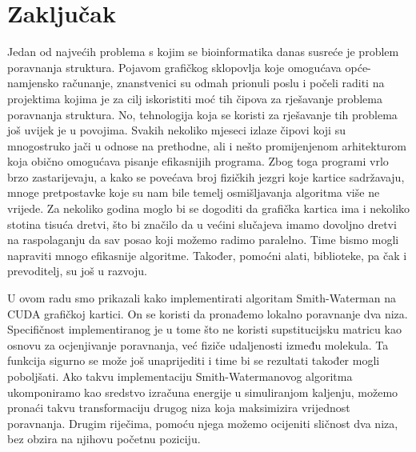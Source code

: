 \documentclass[times, utf8, zavrsni]{fer}
\begin{document}
\chapter{Zaključak}
\label{chapter:Zakljucak}
Jedan od najvećih problema s kojim se bioinformatika danas
susreće je problem poravnanja struktura. Pojavom grafičkog sklopovlja
koje omogućava opće-namjensko računanje, znanstvenici su odmah
prionuli poslu i počeli raditi na projektima kojima je za cilj
iskoristiti moć tih čipova za rješavanje problema poravnanja
struktura. No, tehnologija koja se koristi za rješavanje tih problema
još uvijek je u povojima. Svakih nekoliko mjeseci izlaze
čipovi koji su mnogostruko jači u odnose na prethodne, ali i
nešto promijenjenom arhitekturom koja obično omogućava pisanje
efikasnijih programa. Zbog toga programi vrlo brzo zastarijevaju,
a kako se povećava broj fizičkih jezgri koje kartice sadržavaju,
mnoge pretpostavke koje su nam bile temelj osmišljavanja algoritma
više ne vrijede. Za nekoliko godina moglo bi se dogoditi da grafička
kartica ima i nekoliko stotina tisuća dretvi, što bi značilo
da u većini slučajeva imamo dovoljno dretvi na raspolaganju
da sav posao koji možemo radimo paralelno. Time bismo mogli
napraviti mnogo efikasnije algoritme. Također, pomoćni alati,
biblioteke, pa čak i prevoditelj, su još u razvoju. 

U ovom radu smo prikazali kako implementirati algoritam Smith-Waterman
na CUDA grafičkoj kartici. On se koristi da pronađemo lokalno
poravnanje dva niza. Specifičnost implementiranog je u tome što
ne koristi supstitucijsku matricu kao osnovu za ocjenjivanje
poravnanja, već fiziče udaljenosti između molekula. Ta funkcija
sigurno se može još unaprijediti i time bi se rezultati također
mogli poboljšati. Ako takvu implementaciju Smith-Watermanovog algoritma
ukomponiramo kao sredstvo izračuna energije u simuliranjom
ka{\-}lje{\-}nju,
možemo pronaći takvu transformaciju
drugog niza koja maksimizira vrijednost poravnanja. Drugim riječima,
pomoću njega možemo ocijeniti sličnost dva niza, bez obzira na 
njihovu početnu poziciju. 



\nocite{*}



\end{document}
